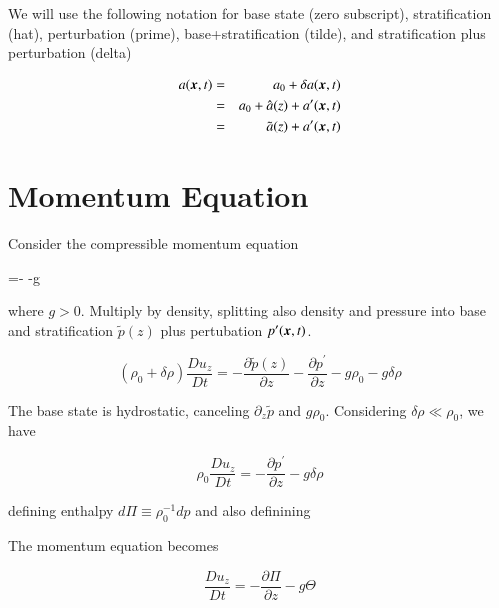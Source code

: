 We will use the following notation for
base state (zero subscript), stratification (hat), perturbation
(prime), base+stratification (tilde), and stratification plus
perturbation (delta)

\begin{eqnarray}
  a({\boldsymbol{x}},t) &=& a_0 + \delta a({\boldsymbol{x}},t)\\
&=&a_0 + \hat{a}(z) + a^\prime({\boldsymbol{x}},t)\\
&=&\tilde{a}(z) + a^\prime({\boldsymbol{x}},t)
\end{eqnarray}

%

\section{Momentum Equation}

Consider the compressible momentum equation

\beq
{}=- -g
\eeq

\noindent where $g>0$.  Multiply by density, splitting also 
density and pressure into base and stratification $\tilde{p}(z)$ plus
pertubation $p^\prime({\boldsymbol{x}},t)$. 

\begin{equation}
(\rho_0+\delta\rho) \frac{Du_z}{Dt}=-\frac{\partial
  \tilde{p}(z)}{\partial z} -\frac{\partial p^\prime}{\partial z} - g\rho_0- g\delta\rho
\end{equation}

The base state is hydrostatic, canceling $\partial_z\tilde{p}$ and
$g\rho_0$. Considering $\delta\rho \ll \rho_0$, we have 

\begin{equation}
\rho_0\frac{Du_z}{Dt}= -\frac{\partial p^\prime}{\partial z} - g\delta\rho
\end{equation}

\noindent defining enthalpy $d\Pi\equiv \rho_0^{-1}dp$ and also definining 
\beq
\Theta \equiv {}
\eeq

The momentum equation becomes 

\begin{equation}
\frac{Du_z}{Dt}= -\frac{\partial\Pi}{\partial z} -g\Theta
\end{equation}

